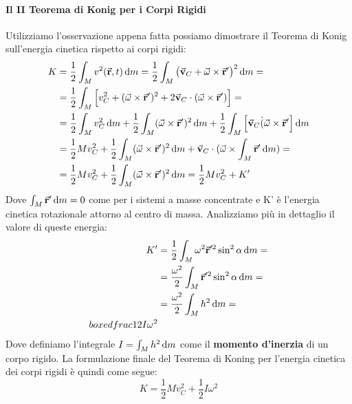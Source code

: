 \documentclass{article}
\renewcommand{\v}{\va{v}}
\renewcommand{\r}{\va{r}}
\begin{document}
\paragraph{Il II Teorema di Konig per i Corpi Rigidi}
Utilizziamo l'osservazione appena fatta possiamo dimostrare il Teorema di Konig sull'energia cinetica rispetto ai corpi rigidi:
\begin{equation}
\begin{split}
    K&=\frac{1}{2}\int_Mv^2(\r,t)\dif m=\frac{1}{2}\int_M\left(\v_C+\va{\omega}\times\r'\right)^2\dif m=\\
    &=\frac{1}{2}\int_M\left[v_C^2+(\va{\omega}\times\r')^2+2\v_C\cdot(\va{\omega}\times\r')\right]=\\
    &=\frac{1}{2}\int_Mv_C^2\dif m+\frac{1}{2}\int_M(\va{\omega}\times\r')^2\dif m+\frac{1}{2}\int_M\left[\v_C\dot(\va{\omega}\times\r'\right]\dif m\\
    &=\frac{1}{2}Mv_C^2+\frac{1}{2}\int_M(\va{\omega}\times\r')^2\dif m+\v_C\cdot(\va{\omega}\times\int_M\r'\dif m)=\\
    &=\frac{1}{2}Mv_C^2+\frac{1}{2}\int_M(\va{\omega}\times\r')^2\dif m=\frac{1}{2}Mv_C^2+K'
\end{split}
\end{equation}
Dove $\int_M\r'\dif m=0$ come per i sistemi a masse concentrate e K' è l'energia cinetica rotazionale attorno al centro di massa. Analizziamo più in dettaglio il valore di queste energia:
\begin{equation}
\begin{split}
    K'&=\frac{1}{2}\int_M\omega^2\r'^2\sin^2\alpha\dif m=\\
    &=\frac{\omega^2}{2}\int_M\r'^2\sin^2\alpha\dif m=\\
    &=\frac{\omega^2}{2}\int_Mh^2\dif m=\\boxed{frac{1}{2}I\omega^2}
\end{split}
\end{equation}
Dove definiamo l'integrale $I=\int_Mh^2\dif m$ come il \textbf{momento d'inerzia} di un corpo rigido.
La formulazione finale del Teorema di Koning per l'energia cinetica dei corpi rigidi è quindi come segue:
\[\boxed{K=\frac{1}{2}Mv_C^2+\frac{1}{2}I\omega^2}\]
\end{document}

